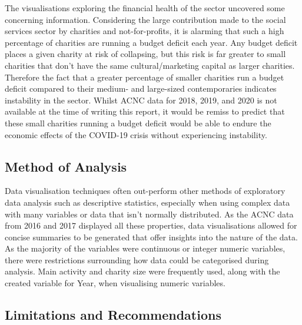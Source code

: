 \documentclass[
  11pt,
]{article}
\begin{document}
The visualisations exploring the financial health of the sector uncovered some concerning information. Considering the large contribution made to the social services sector by charities and not-for-profits, it is alarming that such a high percentage of charities are running a budget deficit each year. Any budget deficit places a given charity at risk of collapsing, but this risk is far greater to small charities that don't have the same cultural/marketing capital as larger charities. Therefore the fact that a greater percentage of smaller charities run a budget deficit compared to their medium- and large-sized contemporaries indicates instability in the sector. Whilst ACNC data for 2018, 2019, and 2020 is not available at the time of writing this report, it would be remiss to predict that these small charities running a budget deficit would be able to endure the economic effects of the COVID-19 crisis without experiencing instability.

\hypertarget{method-of-analysis}{%
\subsection{Method of Analysis}\label{method-of-analysis}}

Data visualisation techniques often out-perform other methods of exploratory data analysis such as descriptive statistics, especially when using complex data with many variables or data that isn't normally distributed. As the ACNC data from 2016 and 2017 displayed all these properties, data visualisations allowed for concise summaries to be generated that offer insights into the nature of the data.\\
As the majority of the variables were continuous or integer numeric variables, there were restrictions surrounding how data could be categorised during analysis. Main activity and charity size were frequently used, along with the created variable for Year, when visualising numeric variables.

\hypertarget{limitations-and-recommendations}{%
\subsection{Limitations and Recommendations}\label{limitations-and-recommendations}}
\end{document}

